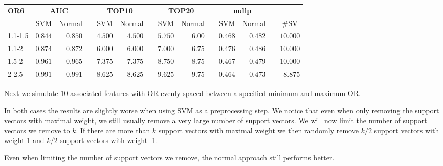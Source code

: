 \documentclass{article}\usepackage[]{graphicx}\usepackage[]{color}
\begin{document}
%
\begin{table}[!tbp]
\begin{center}
\begin{tabular}{lrrcrrcrrcrrcr}
\hline\hline
\multicolumn{1}{l}{\bfseries OR6}&\multicolumn{2}{c}{\bfseries AUC}&\multicolumn{1}{c}{\bfseries }&\multicolumn{2}{c}{\bfseries TOP10}&\multicolumn{1}{c}{\bfseries }&\multicolumn{2}{c}{\bfseries TOP20}&\multicolumn{1}{c}{\bfseries }&\multicolumn{2}{c}{\bfseries nullp}&\multicolumn{1}{c}{\bfseries }&\multicolumn{1}{c}{\bfseries }\tabularnewline
\cline{2-3} \cline{5-6} \cline{8-9} \cline{11-12}
\multicolumn{1}{l}{}&\multicolumn{1}{c}{SVM}&\multicolumn{1}{c}{Normal}&\multicolumn{1}{c}{}&\multicolumn{1}{c}{SVM}&\multicolumn{1}{c}{Normal}&\multicolumn{1}{c}{}&\multicolumn{1}{c}{SVM}&\multicolumn{1}{c}{Normal}&\multicolumn{1}{c}{}&\multicolumn{1}{c}{SVM}&\multicolumn{1}{c}{Normal}&\multicolumn{1}{c}{}&\multicolumn{1}{c}{\#SV}\tabularnewline
\hline
1.1-1.5&$0.844$&$0.850$&&$4.500$&$4.500$&&$5.750$&$6.00$&&$0.468$&$0.482$&&$10.000$\tabularnewline
1.1-2&$0.874$&$0.872$&&$6.000$&$6.000$&&$7.000$&$6.75$&&$0.476$&$0.486$&&$10.000$\tabularnewline
1.5-2&$0.961$&$0.965$&&$7.375$&$7.375$&&$8.750$&$8.75$&&$0.467$&$0.479$&&$10.000$\tabularnewline
2-2.5&$0.991$&$0.991$&&$8.625$&$8.625$&&$9.625$&$9.75$&&$0.464$&$0.473$&&$ 8.875$\tabularnewline
\hline
\end{tabular}
\end{center}
\end{table}





Next we simulate 10 associated features with OR evenly spaced between a specified minimum and maximum OR.




In both cases the results are slightly worse when using SVM as a preprocessing step. We notice that even when only removing the support vectors with maximal weight, we still usually remove a very large number of support vectors. We will now limit the number of support vectors we remove to $k$. If there are more than $k$ support vectors with maximal weight we then randomly remove $k/2$ support vectors with weight 1 and $k/2$ support vectors with weight -1.




Even when limiting the number of support vectors we remove, the normal approach still performs better.
\end{document}
